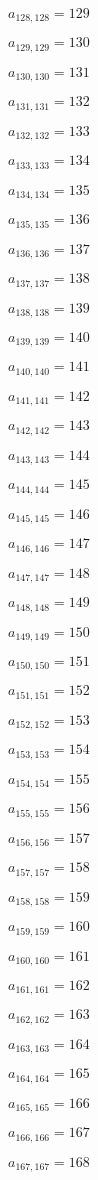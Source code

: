 \documentclass[a4paper,12pt]{article}
\begin{document}
$a _{ 128, 128 } = 129$

$a _{ 129, 129 } = 130$

$a _{ 130, 130 } = 131$

$a _{ 131, 131 } = 132$

$a _{ 132, 132 } = 133$

$a _{ 133, 133 } = 134$

$a _{ 134, 134 } = 135$

$a _{ 135, 135 } = 136$

$a _{ 136, 136 } = 137$

$a _{ 137, 137 } = 138$

$a _{ 138, 138 } = 139$

$a _{ 139, 139 } = 140$

$a _{ 140, 140 } = 141$

$a _{ 141, 141 } = 142$

$a _{ 142, 142 } = 143$

$a _{ 143, 143 } = 144$

$a _{ 144, 144 } = 145$

$a _{ 145, 145 } = 146$

$a _{ 146, 146 } = 147$

$a _{ 147, 147 } = 148$

$a _{ 148, 148 } = 149$

$a _{ 149, 149 } = 150$

$a _{ 150, 150 } = 151$

$a _{ 151, 151 } = 152$

$a _{ 152, 152 } = 153$

$a _{ 153, 153 } = 154$

$a _{ 154, 154 } = 155$

$a _{ 155, 155 } = 156$

$a _{ 156, 156 } = 157$

$a _{ 157, 157 } = 158$

$a _{ 158, 158 } = 159$

$a _{ 159, 159 } = 160$

$a _{ 160, 160 } = 161$

$a _{ 161, 161 } = 162$

$a _{ 162, 162 } = 163$

$a _{ 163, 163 } = 164$

$a _{ 164, 164 } = 165$

$a _{ 165, 165 } = 166$

$a _{ 166, 166 } = 167$

$a _{ 167, 167 } = 168$
\end{document}
